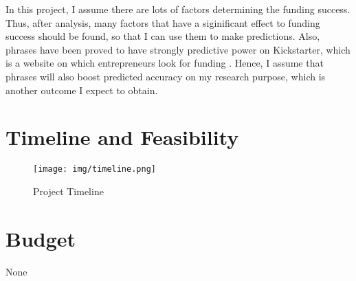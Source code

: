 \documentclass[11pt]{article}
\begin{document}
In this project, I assume there are lots of factors determining the funding success. Thus, after analysis, many factors that have a siginificant effect to funding success should be found, so that I can use them to make predictions. Also, phrases have been proved to have strongly predictive power on Kickstarter, which is a website on which entrepreneurs look for funding \cite{inproceedings}. Hence, I assume that phrases will also boost predicted accuracy on my research purpose, which is another outcome I expect to obtain.

\section{Timeline and Feasibility}

\begin{figure}[H]
    \centering
    \texttt{[image: img/timeline.png]}
    \caption{Project Timeline}
\end{figure}

\section{Budget}

None





\end{document}
